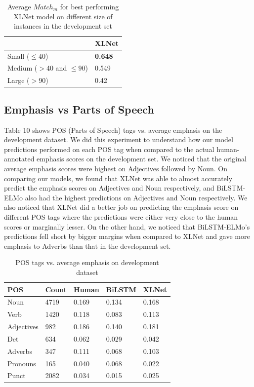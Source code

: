 \documentclass[letterpaper]{article} %
\begin{document}
\begin{table}[h!]
    \centering
    \begin{tabular}{|l|l|}
    \hline
         & \textbf{XLNet} \\
         \hline
    Small ($\leq40$) & \textbf{0.648}  \\
    \hline
    Medium ($>$40 and $\leq90$) & 0.549 \\
    \hline
    Large ($>$90) & 0.42 \\
    \hline
    \end{tabular}
    \caption{Average $Match_m$ for best performing XLNet model on different size of instances in the development set}
    \label{table:8}
\end{table}

\subsection{Emphasis vs Parts of Speech}
Table 10 shows POS (Parts of Speech) tags vs. average emphasis on the development dataset. We did this experiment to understand how our model predictions performed on each POS tag when compared to the actual human-annotated emphasis scores on the development set. We noticed that the original average emphasis scores were highest on Adjectives followed by Noun. On comparing our models, we found that XLNet was able to almost accurately predict the emphasis scores on Adjectives and Noun respectively, and BiLSTM-ELMo also had the highest predictions on Adjectives and Noun respectively. We also noticed that XLNet did a better job on predicting the emphasis score on different POS tags where the predictions were either very close to the human scores or marginally lesser. On the other hand, we noticed that BiLSTM-ELMo's predictions fell short by bigger margins when compared to XLNet and gave more emphasis to Adverbs than that in the development set.

\begin{table}[h!]
    \centering
    \begin{tabular}{|l|l|l|l|l|}
    \hline
    \textbf{POS} & \textbf{Count} & \textbf{Human} & \textbf{BiLSTM} & \textbf{XLNet} \\
    \hline
    Noun & 4719 & 0.169 & 0.134 & 0.168 \\
    \hline
    Verb & 1420 & 0.118 & 0.083 & 0.113 \\
    \hline
    Adjectives & 982 & 0.186 & 0.140 & 0.181 \\
    \hline
    Det & 634 & 0.062 & 0.029 & 0.042 \\
    \hline
    Adverbs & 347 & 0.111 & 0.068 & 0.103 \\
    \hline
    Pronouns & 165 & 0.040 & 0.068 & 0.022 \\
    \hline
    Punct & 2082 & 0.034 & 0.015 & 0.025 \\
    \hline
    \end{tabular}
    \caption{POS tags vs. average emphasis on development dataset}
    \label{table:9}
\end{table}
\end{document}
